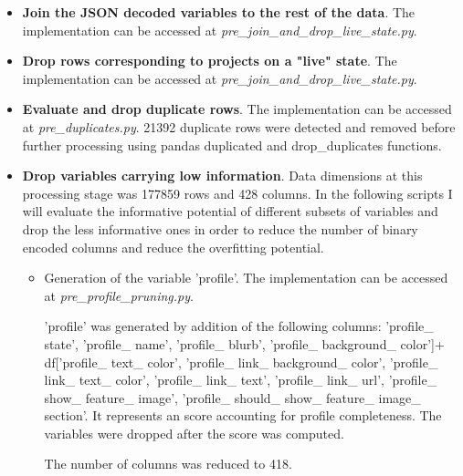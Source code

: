 \documentclass{article}
\begin{document}
{\begin{itemize}
    The variable 'state\_group' was generated by grouping the canceled and suspended projects into 'failed'. It contains then 3 distinct levels ('successful', 'failed' and 'live').
    
    The variable 'state\_code' was generated by dummification from 'state\_grouped' (failed = 0, successful=1, live=2). There are 114940 successful projects, 84311 failed projects and 6651 live projects.

   \item \textbf{Join the JSON decoded variables to the rest of the data}.
   The implementation can be accessed at \emph{pre\_join\_and\_drop\_live\_state.py}.
   
    \item \textbf{Drop rows corresponding to projects on a "live" state}.
    The implementation can be accessed at \emph{pre\_join\_and\_drop\_live\_state.py}.
    
    \item \textbf{Evaluate and drop duplicate rows}.
    The implementation can be accessed at \emph{pre\_duplicates.py}.
    21392 duplicate rows were detected and removed before further processing using pandas duplicated and drop\_duplicates functions.
    
    \item \textbf{Drop variables carrying low information}.
    Data dimensions at this processing stage was 177859 rows and 428 columns. In the following scripts I will evaluate the informative potential of different subsets of variables and drop the less informative ones in order to reduce the number of binary encoded columns and reduce the overfitting potential.
    
    \begin{itemize}
	\item Generation of the variable 'profile'.
        The implementation can be accessed at \emph{pre\_profile\_pruning.py}.
	
	'profile' was generated by addition of the following columns: 'profile\_ state', 'profile\_ name', 'profile\_ blurb', 'profile\_ background\_ color']+ df['profile\_ text\_ color', 'profile\_ link\_ background\_ color', 'profile\_ link\_ text\_ color', 'profile\_ link\_ text', 'profile\_ link\_ url', 'profile\_ show\_ feature\_ image', 'profile\_ should\_ show\_ feature\_ image\_ section'. It represents an score accounting for profile completeness. The variables were dropped after the score was computed.
        
	The number of columns was reduced to 418.
	

\end{itemize}
\end{itemize}}
\end{document}
